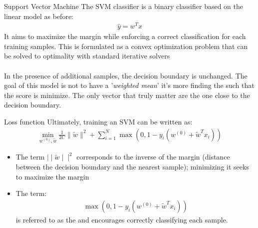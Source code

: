 \begin{parag}{Support Vector Machine}
    The SVM classifier is a binary classifier based on the linear model as before:
	\begin{align*} 
		\hat{y} = w^{T}x
	\end{align*}
	It aims to maximize the margin while enforcing a correct classification for each training samples. This is formulated as a convex optimization problem that can be solved to optimality with standard iterative solvers\\
	$ $\\
	In the presence of additional samples, the decision boundary is unchanged. The goal of this model is not to have a '\textit{weighted mean}' it's more finding the  such that the score is minimize. The only vector that truly matter are the one close to the decision boundary.
\end{parag}
\begin{parag}{Loss function}
    Ultimately, training an SVM can be written as:
	\begin{align*} \min_{w^{(0)}, \widetilde{w}} \frac{1}{2C}\|\widetilde{w}\|^2
+ \sum_{i=1}^{N}\max\left(0, 1 - y_i \left(w^{(0)} + \widetilde{w}^Tx_i\right)\right)
	\end{align*}
	\begin{itemize}
	    \item The term $\mid\mid\widetilde{w}\mid\mid^2$ corresponds to the inverse of the margin (distance between the decision boundary and the nearest sample); minimizing it seeks to maximize the margin
	    \item The term:
			\begin{align*} 
				\max\left(0, 1 - y_i\left(w^{\left(0\right)} + \widetilde{w}^{T}x_i\right)\right)
			\end{align*}
			is referred to as the  and encourages correctly classifying each sample.
	\end{itemize}
	
\end{parag}















